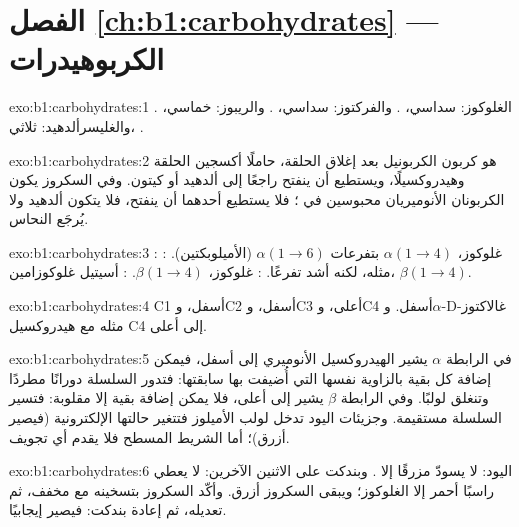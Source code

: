 \section*{الفصل \ref{ch:b1:carbohydrates} --- الكربوهيدرات}

\begin{solution}{exo:b1:carbohydrates:1}
الغلوكوز: سداسي، . والفركتوز: سداسي، . والريبوز: خماسي،
. والغليسرألدهيد: ثلاثي، .
\end{solution}

\begin{solution}{exo:b1:carbohydrates:2}
هو كربون الكربونيل بعد إغلاق الحلقة، حاملًا أكسجين الحلقة
وهيدروكسيلًا، ويستطيع أن ينفتح راجعًا إلى ألدهيد أو كيتون. وفي
السكروز يكون الكربونان الأنوميريان محبوسين في ؛
فلا يستطيع أحدهما أن ينفتح، فلا يتكون ألدهيد ولا يُرجَع النحاس.
\end{solution}

\begin{solution}{exo:b1:carbohydrates:3}
: غلوكوز، $\alpha(1{\to}4)$ بتفرعات $\alpha(1{\to}6)$
(الأميلوبكتين). : مثله، لكنه أشد تفرعًا. :
غلوكوز، $\beta(1{\to}4)$. : أسيتيل غلوكوزامين،
$\beta(1{\to}4)$.
\end{solution}

\begin{solution}{exo:b1:carbohydrates:4}
C1 أسفل، وC2 أسفل، وC3 أعلى، وC4 أسفل. و$\alpha$-D-غالاكتوز مثله مع
هيدروكسيل C4 إلى أعلى.
\end{solution}

\begin{solution}{exo:b1:carbohydrates:5}
في الرابطة $\alpha$ يشير الهيدروكسيل الأنوميري إلى أسفل، فيمكن إضافة
كل بقية بالزاوية نفسها التي أُضيفت بها سابقتها: فتدور السلسلة دورانًا
مطردًا وتنغلق لولبًا. وفي الرابطة $\beta$ يشير إلى أعلى، فلا يمكن
إضافة بقية إلا مقلوبة: فتسير السلسلة مستقيمة. وجزيئات اليود تدخل لولب
الأميلوز فتتغير حالتها الإلكترونية (فيصير أزرق)؛ أما الشريط المسطح
فلا يقدم أي تجويف.
\end{solution}

\begin{solution}{exo:b1:carbohydrates:6}
اليود: لا يسودّ مزرقًا إلا . وبندكت على الاثنين الآخرين: لا
يعطي راسبًا أحمر إلا الغلوكوز؛ ويبقى السكروز أزرق. وأكّد السكروز
بتسخينه مع  مخفف، ثم تعديله، ثم إعادة بندكت: فيصير إيجابيًا.
\end{solution}

